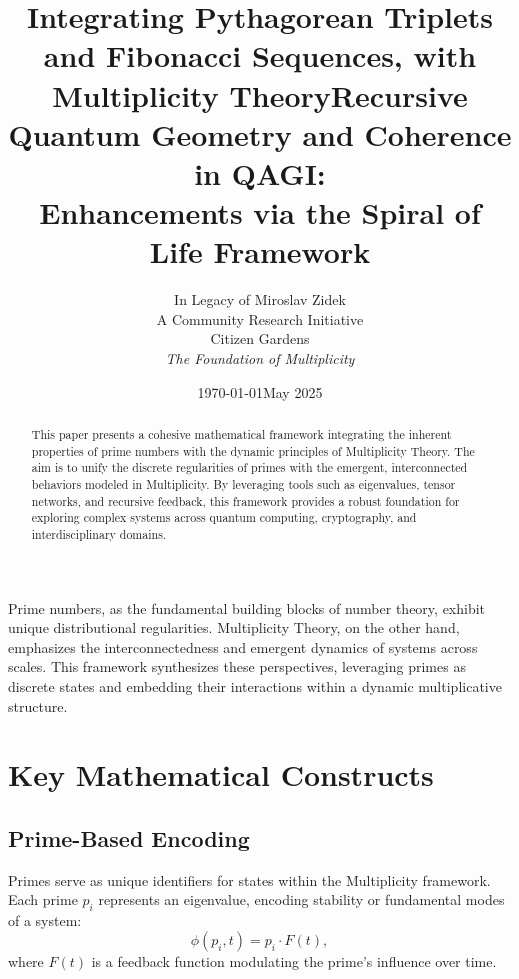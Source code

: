 \documentclass[11pt]{article}
\begin{document}
\title{Integrating Pythagorean Triplets and Fibonacci Sequences, with Multiplicity Theory}
\title{Recursive Quantum Geometry and Coherence in QAGI:\\ Enhancements via the Spiral of Life Framework}
\author{In Legacy of Miroslav Zidek \\ A Community Research Initiative\\ Citizen Gardens \\ \textit{The Foundation of Multiplicity}}
\date{\today}
\date{May 2025}
\maketitle

\begin{abstract}
This paper presents a cohesive mathematical framework integrating the inherent properties of prime numbers with the dynamic principles of Multiplicity Theory. The aim is to unify the discrete regularities of primes with the emergent, interconnected behaviors modeled in Multiplicity. By leveraging tools such as eigenvalues, tensor networks, and recursive feedback, this framework provides a robust foundation for exploring complex systems across quantum computing, cryptography, and interdisciplinary domains.
\end{abstract}

Prime numbers, as the fundamental building blocks of number theory, exhibit unique distributional regularities. Multiplicity Theory, on the other hand, emphasizes the interconnectedness and emergent dynamics of systems across scales. This framework synthesizes these perspectives, leveraging primes as discrete states and embedding their interactions within a dynamic multiplicative structure.

\section{Key Mathematical Constructs}

\subsection{Prime-Based Encoding}
Primes serve as unique identifiers for states within the Multiplicity framework. Each prime $p_i$ represents an eigenvalue, encoding stability or fundamental modes of a system:
\begin{equation}
\phi(p_i, t) = p_i \cdot F(t),
\end{equation}
where $F(t)$ is a feedback function modulating the prime's influence over time.
\end{document}
